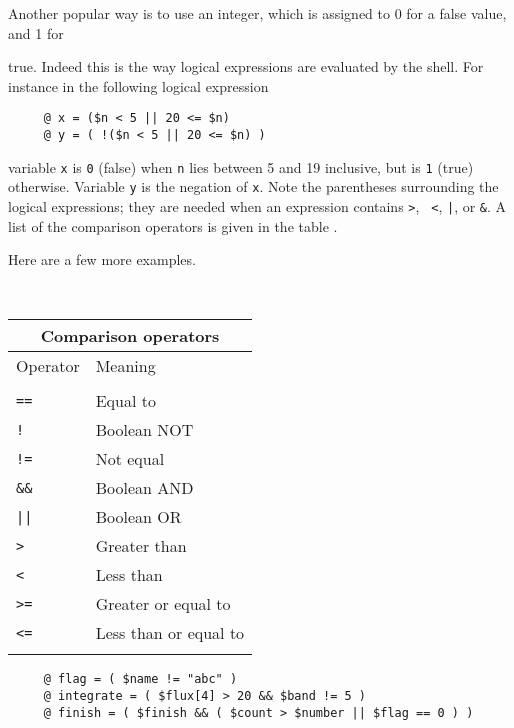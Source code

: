 Another popular way is to use an integer, which is assigned to 0 for
a false value, and 1 for 
\begin{minipage}{80mm}
\smallskip
true.  Indeed this is the way logical expressions are evaluated by the
shell.  For instance in the following logical expression

\small
\begin{verbatim}
     @ x = ($n < 5 || 20 <= $n)
     @ y = ( !($n < 5 || 20 <= $n) )
\end{verbatim}
\normalsize
\normalsize
variable {\tt x} is {\tt 0} (false) when {\tt n} lies between 5 and 19
inclusive, but is {\tt 1} (true) otherwise.  Variable {\tt y} is the
negation of {\tt x}.  Note the parentheses surrounding the logical
expressions; they are needed when an expression contains {\tt >}, {\tt
<}, {\tt |}, or {\tt \&}.  A list of the comparison operators is given
in the table .
\smallskip

Here are a few more examples.
\end{minipage}
\ \hfill \
\begin{minipage}{64mm}
\vspace*{3mm}
\label{sc4_tab_comp_oper}
\begin{tabular}{ll}
\hline
\multicolumn{2}{c}{Comparison operators} \\ \hline
Operator & Meaning \\ \hline
\vspace*{-\medskipamount} \\
{\tt ==} & Equal to \\
{\tt !}  & Boolean NOT \\
{\tt !=} & Not equal \\
{\tt \&\&} & Boolean AND \\
{\tt ||} & Boolean OR \\
{\tt >} & Greater than \\
{\tt <} & Less than \\
{\tt >=} & Greater or equal to \\
{\tt <=} & Less than or equal to \\ 
\vspace*{-\medskipamount} \\ \hline
\end{tabular}
\end{minipage}
\vspace*{1mm}

\small
\begin{verbatim}
     @ flag = ( $name != "abc" )
     @ integrate = ( $flux[4] > 20 && $band != 5 )
     @ finish = ( $finish && ( $count > $number || $flag == 0 ) )
\end{verbatim}
\normalsize

